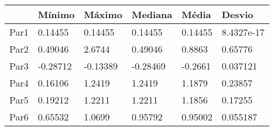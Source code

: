 \begin{tabular}{llllll}
& Mínimo & Máximo & Mediana & Média & Desvio \\ 
\hline 
Par1 & 0.14455 & 0.14455 & 0.14455 & 0.14455 & 8.4327e-17 \\ 
Par2 & 0.49046 & 2.6744 & 0.49046 & 0.8863 & 0.65776 \\ 
Par3 & -0.28712 & -0.13389 & -0.28469 & -0.2661 & 0.037121 \\ 
Par4 & 0.16106 & 1.2419 & 1.2419 & 1.1879 & 0.23857 \\ 
Par5 & 0.19212 & 1.2211 & 1.2211 & 1.1856 & 0.17255 \\ 
Par6 & 0.65532 & 1.0699 & 0.95792 & 0.95002 & 0.055187 \\ 
\hline 
\end{tabular}